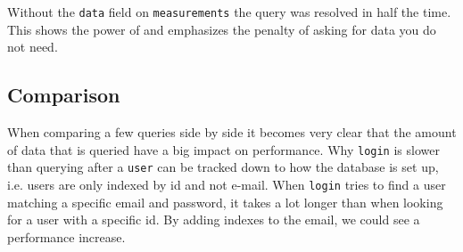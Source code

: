 Without the \verb+data+ field on \verb+measurements+ the query was resolved in half the time. 
This shows the power of  and emphasizes the penalty of asking for data you do not need.


\subsection{Comparison}
When comparing a few queries side by side it becomes very clear that the amount of data that is queried have a big impact on performance. 
Why \verb+login+ is slower than querying after a \verb+user+ can be tracked down to how the database is set up, i.e. users are only indexed by id and not e-mail.
When \verb+login+ tries to find a user matching a specific email and password, it takes a lot longer than when looking for a user with a specific id. 
By adding indexes to the email, we could see a performance increase. 

